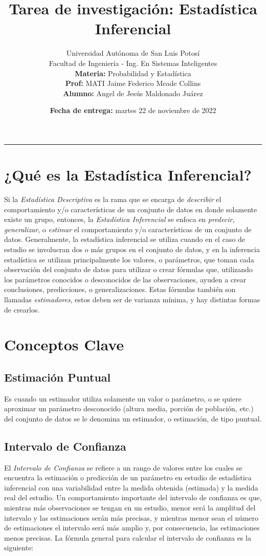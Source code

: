 \documentclass[a4paper, 12pt]{article}
\title{\vspace{-3cm}Tarea de investigación: Estadística Inferencial}
\author{
    Universidad Autónoma de San Luis Potosí\\
    Facultad de Ingeniería - Ing. En Sistemas Inteligentes\\
    \textbf{Materia:} Probabilidad y Estadística\\
    \textbf{Prof:} MATI Jaime Federico Meade Collins\\
    \textbf{Alumno:} Angel de Jesús Maldonado Juárez\\
}
\date{\textbf{Fecha de entrega:} martes 22 de noviembre de 2022}
\begin{document}
\maketitle

\hrule

\section{¿Qué es la Estadística Inferencial?}
Si la \emph{Estadística Descriptiva} es la rama que se encarga de \emph{describir} el comportamiento y/o características de un conjunto de datos en donde solamente existe un grupo, entonces, la \emph{Estadística Inferencial} se enfoca en \emph{predecir}, \emph{generalizar}, o \emph{estimar} el comportamiento y/o características de un conjunto de datos. Generalmente, la estadística inferencial se utiliza cuando en el caso de estudio se involucran dos o más grupos en el conjunto de datos, y en la inferencia estadística se utilizan principalmente los valores, o parámetros, que toman cada observación del conjunto de datos para utilizar o crear fórmulas que, utilizando los parámetros conocidos o desconocidos de las observaciones, ayuden a crear conclusiones, predicciones, o generalizaciones. Estas fórmulas también son llamadas \emph{estimadores}, estos deben ser de varianza mínima, y hay distintas formas de crearlos.

\section{Conceptos Clave}
\subsection{Estimación Puntual}
Es cuando un estimador utiliza solamente un valor o parámetro, o se quiere aproximar un parámetro desconocido (altura media, porción de población, etc.) del conjunto de datos se le denomina un estimador, o estimación, de tipo puntual.

\subsection{Intervalo de Confianza}
El \emph{Intervalo de Confianza} se refiere a un rango de valores entre los cuales se encuentra la estimación o predicción de un parámetro en estudio de estadística inferencial con una variabilidad entre la medida obtenida (estimada) y la medida real del estudio. Un comportamiento importante del intervalo de confianza es que, mientras más observaciones se tengan en un estudio, menor será la amplitud del intervalo y las estimaciones serán más precisas, y mientras menor sean el número de estimaciones el intervalo será más amplio y, por consecuencia, las estimaciones menos precisas. La fórmula general para calcular el intervalo de confianza es la siguiente:
\end{document}
